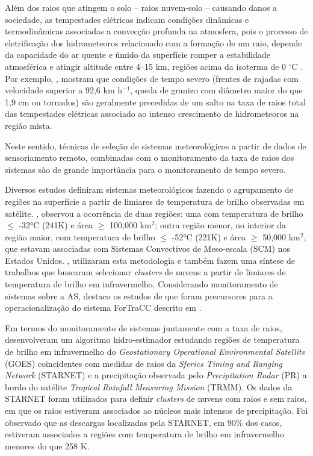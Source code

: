 Além dos raios que atingem o solo -- raios nuvem-solo -- causando danos a sociedade, as tempestades elétricas indicam condições dinâmicas e termodinâmicas associadas a convecção profunda na atmosfera, pois o processo de eletrificação dos hidrometeoros relacionado com a formação de um raio, depende da capacidade do ar quente e úmido da superfície romper a estabilidade atmosférica e atingir altitude entre 4--15 km, regiões acima da isoterma de 0 $^{\circ}$C \cite{doswell2001,zipser2006}. Por exemplo,   , mostram que condições de tempo severo (frentes de rajadas com velocidade superior a 92,6 km h$^{-1}$, queda de granizo com diâmetro maior do que 1,9 cm ou tornados) são geralmente precedidas de um salto na taxa de raios total das tempestades elétricas associado ao intenso crescimento de hidrometeoros na região mista.      

Neste sentido, técnicas de seleção de sistemas meteorológicos a partir de dados de sensoriamento remoto, combinadas com o monitoramento da taxa de raios dos sistemas são de grande importância para o monitoramento de tempo severo. 

Diversos estudos definiram sistemas meteorológicos fazendo o agrupamento de regiões na superfície a partir de limiares de temperatura de brilho observadas em satélite. , observou a ocorrência de duas regiões: uma com temperatura de brilho $\leqslant$ -32°C (241K) e área $\geqslant$ 100,000 km$^2$;  outra região menor, no interior da região maior, com temperatura de brilho $\leqslant$ -52°C (221K) e área $\geqslant$ 50,000 km$^2$, que estavam associadas com Sistemas Convectivos de Meso-escala (SCM) nos Estados Unidos.  , utilizaram esta metodologia e também fazem uma síntese de trabalhos que buscaram selecionar \textit{clusters} de nuvens a partir de limiares de temperatura de brilho em infravermelho. Considerando monitoramento de sistemas sobre a AS, destaco os estudos de  que foram precursores para a operacionalização do sistema ForTraCC descrito em \cite{vila2008}.


Em termos do monitoramento de sistemas juntamente com a taxa de raios,  desenvolveram um algoritmo hidro-estimador estudando regiões de temperatura de brilho em infravermelho do  \textit{Geostationary Operational Environmental Satellite} (GOES) coincidentes com medidas de raios da  \textit{Sferics Timing and Ranging Network} (STARNET) e a precipitação observada pelo \textit{Precipitation Radar} (PR)  a bordo do satélite \textit{Tropical Rainfall Measuring Mission} (TRMM). Os dados da STARNET foram utilizados para definir \textit{clusters} de nuvens com raios e sem raios, em que os raios estiveram associados ao núcleos mais intensos de precipitação. Foi observado que as descargas localizadas pela STARNET, em 90\% dos casos, estiveram associados a regiões com temperatura de brilho em infravermelho menores do que 258 K.


